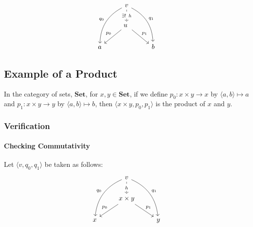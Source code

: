 \documentclass[uplatex,a4j,12pt,dvipdfmx]{jsarticle}
\begin{document}
\[
	\begin{tikzcd}
		& v \arrow[ldd, "q_{0}"', bend right] \arrow[rdd, "q_{1}", bend left] \arrow[d, "\exists ! \ h" description, dashed] & \\
		& u \arrow[ld, "p_{0}"'] \arrow[rd, "p_{1}"] & \\
		a && b
	\end{tikzcd}
\]


\subsection{Example of a Product}

In the category of sets, $\textbf{Set}$, for $x,y \in \textbf{Set}$, if we define $p_{0}:x \times y \to x$ by $\langle a,b \rangle \mapsto a$ and $p_{1}:x \times y \to y$ by $\langle a,b \rangle \mapsto b$, then $\langle x \times y,p_{0},p_{1} \rangle$ is the product of $x$ and $y$.



\subsubsection{Verification}

\paragraph{Checking Commutativity}

Let $\langle v ,q_{0},q_{1} \rangle$ be taken as follows:
\[
	\begin{tikzcd}
		& v \arrow[ldd, "q_{0}"', bend right] \arrow[rdd, "q_{1}", bend left] \arrow[d, "h" description, dashed] & \\
		& x \times y \arrow[ld, "p_{0}"'] \arrow[rd, "p_{1}"]& \\
		x && y
	\end{tikzcd}
\]
\end{document}
